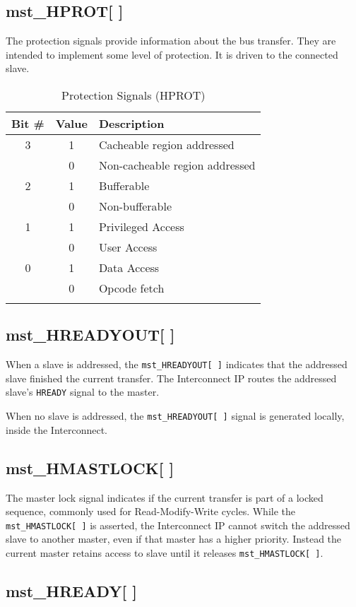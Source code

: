 \subsection{mst\_HPROT[ ]}\label{mst_hprot}

The protection signals provide information about the bus transfer. They
are intended to implement some level of protection. It is driven to the
connected slave.

\begin{longtable}[]{@{}ccl@{}}
\toprule
Bit \# & Value & Description\tabularnewline
\midrule
\endhead
3 & 1 & Cacheable region addressed\tabularnewline
& 0 & Non-cacheable region addressed\tabularnewline
2 & 1 & Bufferable\tabularnewline
& 0 & Non-bufferable\tabularnewline
1 & 1 & Privileged Access\tabularnewline
& 0 & User Access\tabularnewline
0 & 1 & Data Access\tabularnewline
& 0 & Opcode fetch\tabularnewline
\bottomrule
\caption{Protection Signals (HPROT)}
\end{longtable}

\subsection{mst\_HREADYOUT[ ]}\label{mst_hreadyout}

When a slave is addressed, the \texttt{mst\_HREADYOUT[\,]} indicates that the
addressed slave finished the current transfer. The Interconnect IP
routes the addressed slave's \texttt{HREADY} signal to the master.

When no slave is addressed, the \texttt{mst\_HREADYOUT[\,]} signal is generated
locally, inside the Interconnect.

\subsection{mst\_HMASTLOCK[ ]}\label{mst_hmastlock}

The master lock signal indicates if the current transfer is part of a
locked sequence, commonly used for Read-Modify-Write cycles. While the
\texttt{mst\_HMASTLOCK[\,]} is asserted, the Interconnect IP cannot switch the
addressed slave to another master, even if that master has a higher
priority. Instead the current master retains access to slave until it
releases \texttt{mst\_HMASTLOCK[\,]}.

\subsection{mst\_HREADY[ ]}\label{mst_hready}

